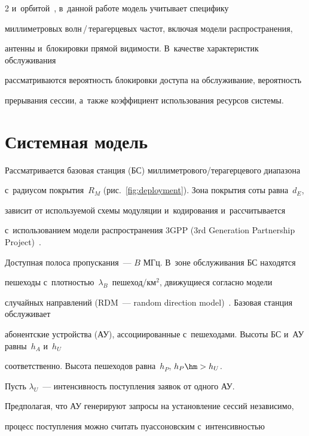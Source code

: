 \begin{multicols}{2}
и~орбитой~\cite{vlaskina2022}, в~данной работе модель учитывает специфику 

мил\-ли\-мет\-ро\-вых волн\,/\,те\-ра\-гер\-це\-вых час\-тот, вклю\-чая модели распространения,

 антенны и~блокировки пря\-мой ви\-ди\-мости. В~качестве характеристик обслуживания 

рассматриваются ве\-ро\-ят\-ность блокировки до\-сту\-па на обслуживание, ве\-ро\-ят\-ность 

прерывания сессии, а~так\-же коэффициент использования ресурсов сис\-темы.



\section{Системная модель}






Рассматривается базовая станция (БС) мил\-ли\-мет\-ро\-во\-го/те\-ра\-гер\-це\-во\-го диапазона 

с~радиусом по\-кры\-тия~$R_M$ (рис.~\ref{fig:deployment}). Зона покрытия соты рав\-на~$d_E$, 

зависит от ис\-поль\-зу\-емой схемы модуляции и~кодирования и~рас\-счи\-ты\-ва\-ет\-ся 

с~использованием модели рас\-про\-стра\-не\-ния 3GPP (3rd Generation Partnership Project)~\cite{kovalchukov2019accurate}. 

До\-ступ\-ная полоса про\-пус\-ка\-ния~--- $B$ МГц. В~зоне обслуживания БС находятся 

пешеходы с~плот\-ностью~$\lambda_B$~пе\-ше\-ход/км$^2$, дви\-жу\-щи\-еся согласно модели 

случайных на\-прав\-ле\-ний (RDM~--- random direction model)~\cite{nain2005properties}. Базовая станция обслуживает 

абонентские устройства (АУ), ас\-со\-ци\-иро\-ван\-ные с~пешеходами. Высоты БС и~АУ равны~$h_A$ и~$h_U$ 

соответственно. Высота пешеходов рав\-на~$h_P$, $h_P\hm>h_U$.





Пусть $\lambda_{U}$~--- интенсивность по\-ступ\-ле\-ния заявок от одного АУ. 

Предполагая, что АУ генерируют запросы на уста\-нов\-ле\-ние сессий независимо, 

процесс по\-ступ\-ле\-ния мож\-но считать пуассоновским с~ин\-тен\-сив\-ностью


\end{multicols}
